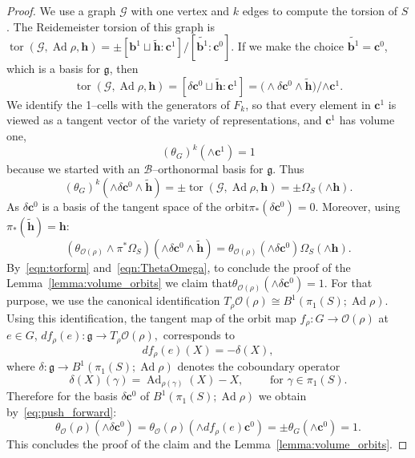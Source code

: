 \documentclass[11pt]{article}
\theoremstyle{definition}
\numberwithin{equation}{section}
\numberwithin{figure}{section}
\numberwithin{table}{section}
\DeclareMathOperator{\tor}{tor}
\DeclareMathOperator{\Ad}{Ad}
\newcommand{\Bcal}{\mathcal{B}}
\newcommand{\Ocal}{\mathcal{O}}
\newcommand{\Gcal}{\mathcal{G}}
\newcommand{\gfrk}{\mathfrak{g}}
\newcommand{\cbf}{\mathbf{c}}
\newcommand{\bbf}{\mathbf{b}}
\newcommand{\hbf}{\mathbf{h}}
\begin{document}
\begin{proof}
We use a graph $\Gcal$ with one vertex and $k$ edges to compute the torsion of $S$. The Reidemeister torsion of this graph is $
\tor(\Gcal,\Ad\rho, \hbf)= \pm { [{\bbf^1}\sqcup \widetilde{\hbf}: \cbf^1]}/{ [\widetilde{\bbf^1} : \cbf^0] }. $ If we make the choice $\widetilde{\bbf^1}=\cbf^0$, which is a basis for $\gfrk$, then
\[
\tor(\Gcal,\Ad\rho, \hbf)= { [\delta{\cbf^0}\sqcup \widetilde{\hbf}: \cbf^1]} = \big(\wedge\delta{\cbf^0}\wedge \widetilde{\hbf}\big) \slash {\wedge\cbf^1}.
\]
We identify the 1--cells with the generators of $F_k$, so that every element in $\cbf^1$ is viewed as a tangent vector of the variety of representations, and $\cbf^1$ has volume one,
\[
(\theta_G)^{k} (\wedge \cbf^1) = 1
\]
because we started with an $\Bcal$--orthonormal basis for $\gfrk$. Thus
\begin{equation}\label{eqn:torform}
(\theta_G)^{k} (\wedge\delta{\cbf^0}\wedge \widetilde{\hbf})=\pm
\tor(\Gcal,{\Ad\rho, \hbf})= \pm \Omega_S(\wedge \hbf).
\end{equation}
As $\delta\cbf^0$ is a basis of the tangent space of the orbit$\pi_*(\delta\cbf^0)=0$. Moreover, using $\pi_*(\widetilde{\hbf})= \hbf$:
\begin{equation}\label{eqn:ThetaOmega}
(\theta_{\Ocal(\rho)}\wedge \pi^* \Omega_S) (\wedge \delta{\cbf^0}\wedge \widetilde{\hbf}) =
\theta_{\Ocal(\rho)}(\wedge \delta{\cbf^0}) \Omega_S(\wedge \hbf).
\end{equation}
By~\eqref{eqn:torform} and~\eqref{eqn:ThetaOmega}, to conclude the proof of the Lemma~\ref{lemma:volume_orbits} we claim that\linebreak $\theta_{\Ocal(\rho)}(\wedge \delta{\cbf^0})=1$. For that purpose, we use the canonical identification $T_\rho \Ocal(\rho) \cong B^1(\pi_1(S);\Ad\rho)$. Using this identification, the tangent map of the orbit map $f_\rho\colon G\to\Ocal(\rho)$ at $e\in G$, $ df_\rho(e)\colon \gfrk \to T_\rho \Ocal(\rho), $ corresponds to
\[
df_\rho(e)(X) = -\delta(X),
\]
where $\delta\colon \gfrk\to B^1(\pi_1(S);\Ad\rho)$ denotes the coboundary operator
\[
\delta(X) (\gamma) = \Ad_{\rho(\gamma)}(X)-X,\qquad\text{ for }
\gamma\in\pi_1(S).
\]
Therefore for the basis $ \delta\cbf^0$ of $B^1(\pi_1(S);\Ad\rho)$ we obtain by~\eqref{eq:push_forward}:
\begin{equation*}
\theta_{\Ocal}(\rho) (\wedge \delta\cbf^0) =
\theta_{\Ocal}(\rho) (\wedge df_\rho(e)\cbf^0) =
\pm \theta_{G}(\wedge \cbf^0)= 1.
\end{equation*}
This concludes the proof of the claim and the Lemma~\ref{lemma:volume_orbits}.
\end{proof}
\end{document}
